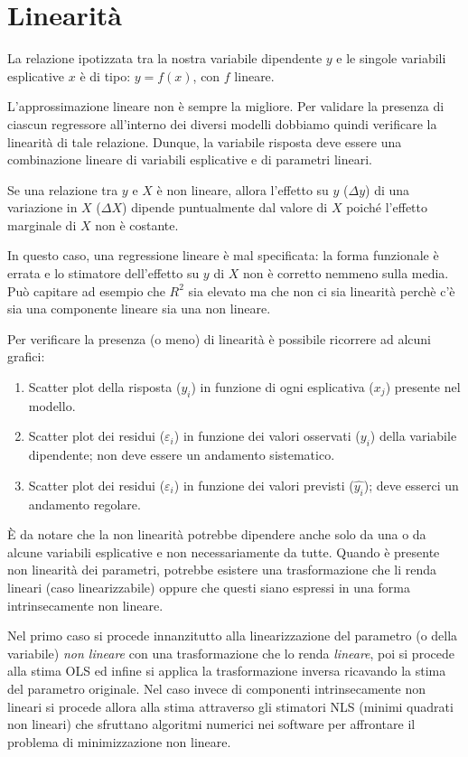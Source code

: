 \documentclass[a4page, 11pt]{article} %
\begin{document}
\section{Linearità}

La relazione ipotizzata tra la nostra variabile dipendente $y$ e le singole variabili esplicative $x$ è di tipo: $y = f (x)$, con $f$ lineare.

L'approssimazione lineare non è sempre la migliore.
Per validare la presenza di ciascun regressore all’interno dei diversi modelli dobbiamo quindi verificare la linearità di tale relazione.
Dunque, la variabile risposta deve essere una combinazione lineare di variabili esplicative e di parametri lineari.

Se una relazione tra $y$ e $X$ è non lineare, allora l’effetto su $y$ ($\Delta y$)  di una variazione in $X$ ($\Delta X$) dipende puntualmente dal valore di $X$ poiché l’effetto marginale di $X$ non è costante. 

In questo caso, una regressione lineare è mal specificata: la forma funzionale è errata e lo stimatore dell’effetto su $y$ di $X$ non è corretto nemmeno sulla media. 
Può capitare ad esempio che $R^{2}$ sia elevato ma che non ci sia linearità perchè c'è sia una componente lineare sia una non lineare. 

Per verificare la presenza (o meno) di linearità è possibile ricorrere ad alcuni grafici: 
\begin{enumerate}[noitemsep]
\item Scatter plot della risposta ($y_i$) in funzione di ogni esplicativa ($x_j$) presente nel modello.
\item Scatter plot dei residui ($\varepsilon_i$) in funzione dei valori osservati ($y_i$) della variabile dipendente; non deve essere un andamento sistematico.
\item Scatter plot dei residui ($\varepsilon_i$) in funzione dei valori previsti ($\hat{y_i}$); deve esserci un andamento regolare.
\end{enumerate}
È da notare che la non linearità potrebbe dipendere anche solo da una o da alcune variabili esplicative e non necessariamente da tutte.
Quando è presente non linearità dei parametri, potrebbe esistere una trasformazione che li renda lineari (caso linearizzabile) oppure che questi siano espressi in una forma intrinsecamente non lineare.

Nel primo caso si procede innanzitutto alla linearizzazione del parametro (o della variabile) \textit{non lineare} con una trasformazione che lo renda \textit{lineare}, poi si procede alla stima OLS ed infine si applica la trasformazione inversa ricavando la stima del parametro originale. 
Nel caso invece di componenti intrinsecamente non lineari si procede allora alla stima attraverso gli stimatori NLS (minimi quadrati non lineari) che sfruttano algoritmi numerici nei software per affrontare il problema di minimizzazione non lineare.
\end{document}
